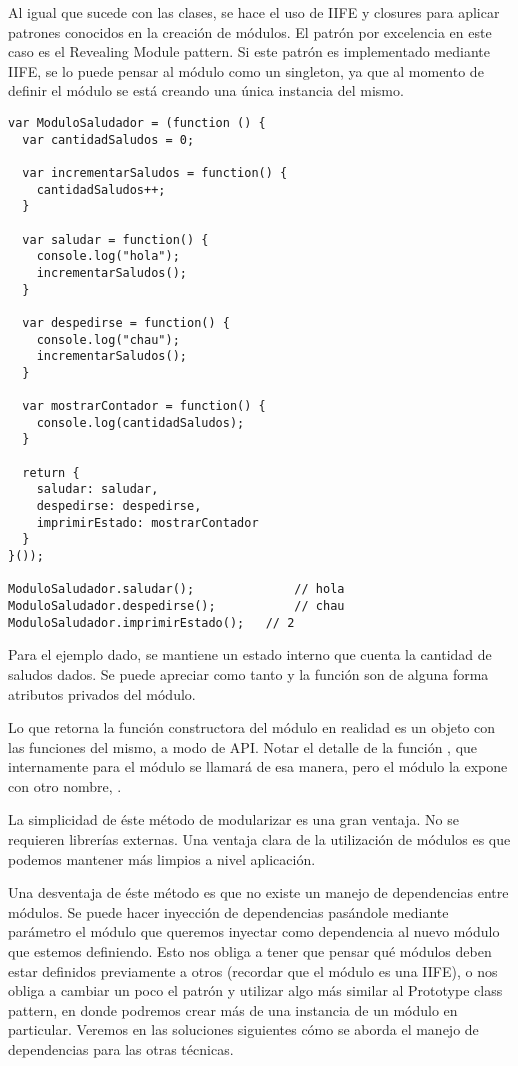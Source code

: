 Al igual que sucede con las clases, se hace el uso de IIFE y closures para aplicar patrones conocidos en la creación de módulos. El patrón por excelencia en este caso es el Revealing Module pattern. Si este patrón es implementado mediante IIFE, se lo puede pensar al módulo como un singleton, ya que al momento de definir el módulo se está creando una única instancia del mismo.

\begin{lstlisting}[title={Revealing module pattern}]
var ModuloSaludador = (function () {
  var cantidadSaludos = 0;

  var incrementarSaludos = function() {
    cantidadSaludos++;
  }

  var saludar = function() {
    console.log("hola");
    incrementarSaludos();
  }

  var despedirse = function() {
    console.log("chau");
    incrementarSaludos();
  }

  var mostrarContador = function() {
    console.log(cantidadSaludos);
  }

  return {
    saludar: saludar,
    despedirse: despedirse,
    imprimirEstado: mostrarContador
  }
}());

ModuloSaludador.saludar();				// hola
ModuloSaludador.despedirse();			// chau
ModuloSaludador.imprimirEstado();	// 2
\end{lstlisting}

Para el ejemplo dado, se mantiene un estado interno que cuenta la cantidad de saludos dados. Se puede apreciar como tanto  y la función  son de alguna forma atributos privados del módulo. 

Lo que retorna la función constructora del módulo en realidad es un objeto con las funciones del mismo, a modo de API. Notar el detalle de la función , que internamente para el módulo se llamará de esa manera, pero el módulo la expone con otro nombre, .

La simplicidad de éste método de modularizar es una gran ventaja. No se requieren librerías externas. Una ventaja clara de la utilización de módulos es que podemos mantener  más limpios a nivel aplicación.

Una desventaja de éste método es que no existe un manejo de dependencias entre módulos. Se puede hacer inyección de dependencias pasándole mediante parámetro el módulo que queremos inyectar como dependencia al nuevo módulo que estemos definiendo. Esto nos obliga a tener que pensar qué módulos deben estar definidos previamente a otros (recordar que el módulo es una IIFE), o nos obliga a cambiar un poco el patrón y utilizar algo más similar al Prototype class pattern, en donde podremos crear más de una instancia de un módulo en particular. Veremos en las soluciones siguientes cómo se aborda el manejo de dependencias para las otras técnicas.

